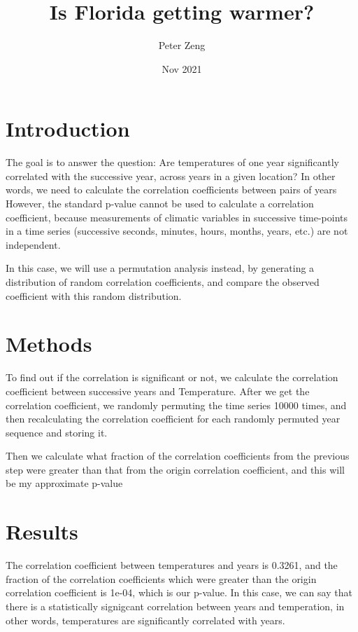 \documentclass[8pt]{article}
\title{Is Florida getting warmer?}
\author{Peter Zeng}
\date{Nov 2021}
\begin{document}
    \maketitle

    \section{Introduction}
        The goal is to answer the question: Are temperatures of one year significantly correlated with the successive year, across years in a given location? 
        In other words, we need to calculate the correlation coefficients between pairs of years
        However, the standard p-value cannot be used to calculate a correlation coefficient, because
        measurements of climatic variables in successive time-points in a time series (successive seconds, minutes, hours, months, years, etc.)
        are not independent. 
        
        In this case, we will use a permutation analysis instead, by generating a distribution of random correlation coefficients, 
        and compare the observed coefficient with this random distribution.
    
    \section{Methods}
        To find out if the correlation is significant or not, we calculate the correlation coefficient between successive years and Temperature. 
        After we get the correlation coefficient, we randomly permuting the time series 10000 times, and then recalculating the correlation
        coefficient for each randomly permuted year sequence and storing it. 

        Then we calculate what fraction of the correlation coefficients from the previous step were greater than that from the origin correlation 
        coefficient, and this will be my approximate p-value

    \section{Results}
        The correlation coefficient between temperatures and years is 0.3261, and the fraction of the correlation coefficients which   
        were greater than the origin correlation coefficient is 1e-04, which is our p-value. In this case, we can say that there is a statistically signigcant correlation 
        between years and temperation, in other words, temperatures are significantly correlated with years.
\end{document}
